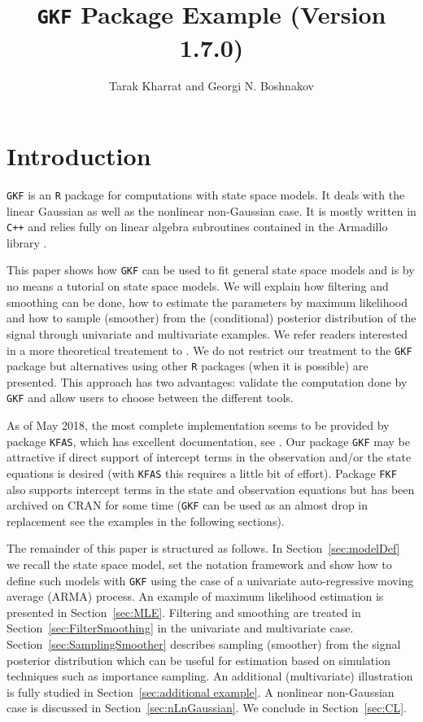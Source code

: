 \documentclass{article}
\newcommand{\R}{\texttt{R}\xspace}
\newcommand{\GKF}{\texttt{GKF}\xspace}
\begin{document}

\title{\GKF Package Example (Version 1.7.0)}
\author{Tarak Kharrat and Georgi N. Boshnakov}
\maketitle


\section*{Introduction}

\GKF is an \R package for computations with state space models. It deals with the linear
Gaussian as well as the nonlinear non-Gaussian case. It is mostly written in \texttt{C++} and
relies fully on linear algebra subroutines contained in the Armadillo library
\citep{sanderson2010armadillo}.

This paper shows how \GKF can be used to fit general state space models and is by no means a
tutorial on state space models. We will explain how filtering and smoothing can be done, how
to estimate the parameters by maximum likelihood and how to sample (smoother) from the
(conditional) posterior distribution of the signal through univariate and multivariate
examples. We refer readers interested in a more theoretical treatement to
\citet{durbin2012time}. We do not restrict our treatment to the \GKF package but alternatives
using other \R packages (when it is possible) are presented. This approach has two
advantages: validate the computation done by \GKF and allow users to choose between the
different tools. 

As of May 2018, the most complete implementation seems to be provided by package
\texttt{KFAS}, which has excellent documentation, see \citet{KFASjss2017}.  Our package \GKF
may be attractive if direct support of intercept terms in the observation and/or the state
equations is desired (with \texttt{KFAS} this requires a little bit of effort). Package \texttt{FKF}
also supports intercept terms in the state and observation equations but has been archived on
CRAN for some time (\GKF can be used as an almost drop in replacement see the examples in the
following sections).

The remainder of this paper is structured as follows. In Section~\ref{sec:modelDef} we recall
the state space model, set the notation framework and show how to define such models with
\GKF using the case of a univariate auto-regressive moving average (ARMA) process. An example
of maximum likelihood estimation is presented in Section~\ref{sec:MLE}. Filtering and
smoothing are treated in Section~\ref{sec:FilterSmoothing} in the univariate and multivariate
case. Section~\ref{sec:SamplingSmoother} describes sampling (smoother) from the signal
posterior distribution which can be useful for estimation based on simulation techniques such
as importance sampling. An additional (multivariate) illustration is fully studied in
Section~\ref{sec:additional example}. A nonlinear non-Gaussian case is discussed in
Section~\ref{sec:nLnGaussian}. We conclude in Section~\ref{sec:CL}.
\end{document}
